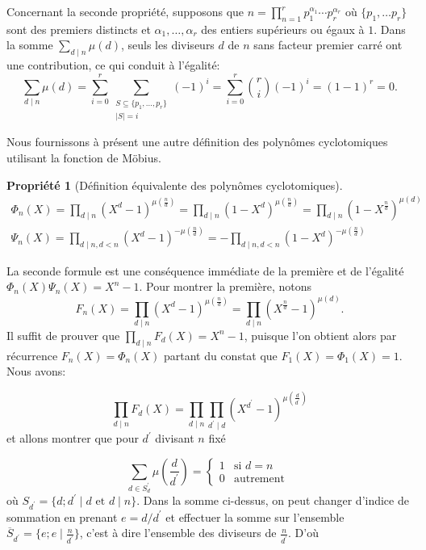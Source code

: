 \documentclass{article}
\theoremstyle{break}                  %
\newtheorem{propriete}{Propriété}
\begin{document}
Concernant la seconde propriété, supposons que $n = \displaystyle \prod_{n = 1}^r p_1^{\alpha_1} \cdots p_r^{\alpha_r}$ où $\{p_1, \dots p_r\}$ sont des premiers distincts et $\alpha_1, \dots, \alpha_r$ des entiers supérieurs ou égaux à $1$. Dans la somme $\displaystyle \sum_{d \mid n} \mu(d)$, seuls les diviseurs $d$ de $n$ sans facteur premier carré ont une contribution, ce qui conduit à l'égalité:
$$\sum_{d \mid n} \mu(d) = \sum_{i = 0}^{r}\sum_{\substack{S \subseteq \{p_1, \dots, p_r\}\\ \left\vert S \right\vert = i}} (-1)^i = \sum_{i = 0}^{r} \binom{r}{i}(-1)^i =(1-1)^r=0.$$

Nous fournissons à présent une autre définition des polynômes cyclotomiques utilisant la fonction de Möbius.

\begin{propriete}[Définition équivalente des polynômes cyclotomiques]
	\begin{align}		
		\Phi_n(X) = \prod_{d \mid n} (X^d - 1)^{\mu(\frac{n}{d})} = \prod_{d \mid n} (1 - X^d)^{\mu(\frac{n}{d})} = \prod_{d \mid n} (1 - X^\frac{n}{d})^{\mu(d)} \tag{2.4}\label{mobphi}\\
		\Psi_n(X) = \prod_{d \mid n, d<n} (X^d - 1)^{-\mu(\frac{n}{d})} = -\prod_{d \mid n, d<n} (1 - X^d)^{-\mu(\frac{n}{d})}\tag{2.5}\label{mobpsi}
	\end{align}
\end{propriete}

La seconde formule est une conséquence immédiate de la première et de l'égalité $\Phi_n(X) \Psi_n(X) = X^n-1$. Pour montrer la première, notons
$$F_n(X) = \prod_{d \mid n} (X^d - 1)^{\mu(\frac{n}{d})} = \prod_{d \mid n} (X^{\frac{n}{d}} - 1)^{\mu(d)}.$$ Il suffit de prouver que $\displaystyle \prod_{ d \mid n} F_d(X) = X^n-1$, puisque l'on obtient alors par récurrence $F_n(X) = \Phi_n(X)$ partant du constat que $F_1(X) = \Phi_1(X) = 1$. Nous avons:

$$\prod_{ d \mid n} F_d(X) = \prod_{ d \mid n} \prod_{d^\prime \mid d} (X^{d^\prime} - 1)^{\mu(\frac{d}{d^\prime})}$$ et allons montrer que pour $d^\prime$ divisant $n$ fixé

$$\sum_{d \in S_d^\prime} \mu\left(\frac{d}{d^\prime}\right)=\begin{cases}1 &\text{si } d= n\\
	0 &\text{autrement }\end{cases}$$ où $S_{d^\prime} = \{d ; d^\prime \mid d \text{ et } d \mid n\}$.
Dans la somme ci-dessus, on peut changer d'indice de sommation en prenant $e = d/d^\prime$ et effectuer la somme sur l'ensemble $\overline{S}_{d^\prime} = \{e ; e \mid \frac{n}{d^\prime}\}$, c'est à dire l'ensemble des diviseurs de $\frac{n}{d^\prime}$. D'où
\end{document}
